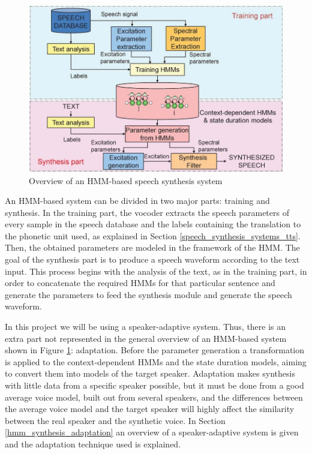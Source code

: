 \begin{figure}[!htb]
\begin{centering}
\includegraphics[width=\textwidth]{images/hmm_based_system_overview.jpg}
\caption{Overview of an HMM-based speech synthesis system \cite{tokuda13}}
\label{fig:hmm_system_overview}
\end{centering}
\end{figure}

An HMM-based system can be divided in two major parts: training and synthesis. 
%
In the training part, the vocoder extracts the speech parameters of every sample in the speech database and the labels containing the translation to the phonetic unit used, as explained in Section \ref{speech_synthesis_systems_tts}.
%
Then, the obtained parameters are modeled in the framework of the HMM.
%
The goal of the synthesis part is to produce a speech waveform according to the text input.
%
This process begins with the analysis of the text, as in the training part, in order to concatenate the required HMMs for that particular sentence and generate the parameters to feed the synthesis module and generate the speech waveform.

In this project we will be using a speaker-adaptive system. 
%
Thus, there is an extra part not represented in the general overview of an HMM-based system shown in Figure \ref{fig:hmm_system_overview}: adaptation. 
%
Before the parameter generation a transformation is applied to the context-dependent HMMs and the state duration models, aiming to convert them into models of the target speaker.
%
Adaptation makes synthesis with little data from a specific speaker possible, but it must be done from a good average voice model, built out from several speakers, and the differences between the average voice model and the target speaker will highly affect the similarity between the real speaker and the synthetic voice.
%
In Section \ref{hmm_synthesis_adaptation} an overview of a speaker-adaptive system is given and the adaptation technique used is explained.

